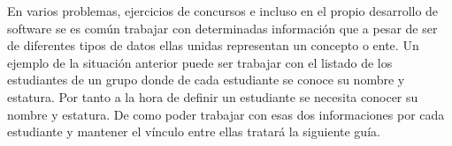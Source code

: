 En varios problemas, ejercicios de concursos e incluso en el propio desarrollo de software se es común trabajar con determinadas información que a pesar de ser de diferentes tipos de datos ellas unidas representan un concepto o ente. Un ejemplo de la situación anterior puede ser trabajar con el listado de los estudiantes de un grupo donde de cada estudiante se conoce su nombre y estatura. Por tanto a la hora de definir un estudiante se necesita conocer su nombre y estatura. De como poder trabajar con esas dos informaciones por cada estudiante y mantener el vínculo entre ellas tratará la siguiente guía.
